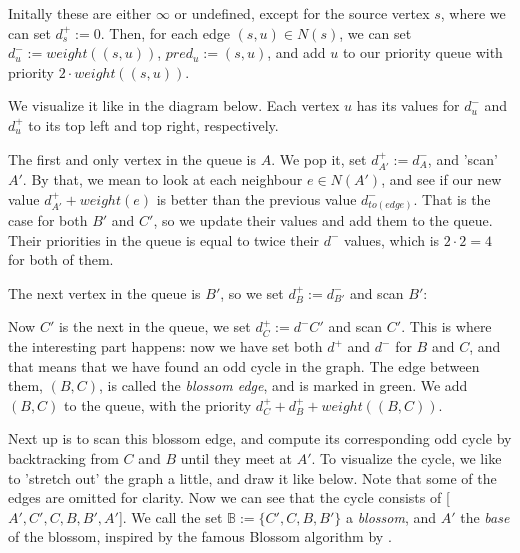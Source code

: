 Initally these are either $\infty$ or undefined, except for the source vertex $s$, where we can set $d^+_s := 0$. Then, for each edge $(s,u) \in N(s)$, we can set $d^-_u := weight((s,u))$, $pred_u := (s,u)$, and add $u$ to our priority queue with priority $2 \cdot weight((s,u))$.

We visualize it like in the diagram below. Each vertex $u$ has its values for $d^-_u$ and $d^+_u$ to its top left and top right, respectively.



The first and only vertex in the queue is $A$. We pop it, set $d^+_{A'} := d^-_A$, and 'scan' $A'$. By that, we mean to look at each neighbour $e \in N(A')$, and see if our new value $d^+_{A'} + weight(e)$ is better than the previous value $d^-_{to(edge)}$. That is the case for both $B'$ and $C'$, so we update their values and add them to the queue. Their priorities in the queue is equal to twice their $d^-$ values, which is $2 \cdot 2 = 4$ for both of them.



The next vertex in the queue is $B'$, so we set $d^+_B := d^-_{B'}$ and scan $B'$:



Now $C'$ is the next in the queue, we set $d^+_C := d^-{C'}$ and scan $C'$. This is where the interesting part happens: now we have set both $d^+$ and $d^-$ for $B$ and $C$, and that means that we have found an odd cycle in the graph. The edge between them, $(B,C)$, is called the \emph{blossom edge}, and is marked in green. We add $(B,C)$ to the queue, with the priority $d^+_C + d^+_B + weight((B,C))$.



Next up is to scan this blossom edge, and compute its corresponding odd cycle by backtracking from $C$ and $B$ until they meet at $A'$. To visualize the cycle, we like to 'stretch out' the graph a little, and draw it like below. Note that some of the edges are omitted for clarity. Now we can see that the cycle consists of [$A',C',C,B,B',A'$]. We call the set $\mathbb{B} := \{C',C,B,B'\}$ a \emph{blossom}, and $A'$ the \emph{base} of the blossom, inspired by the famous Blossom algorithm by \cite{source:blossom}.



